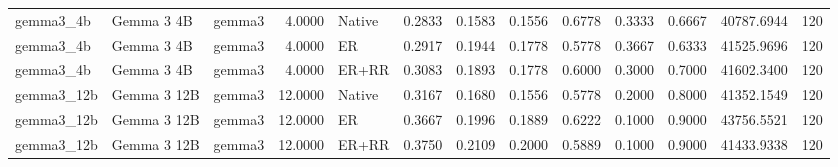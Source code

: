 \begin{tabular}{lllrlrrrrrrrr}
gemma3_4b & Gemma 3 4B & gemma3 & 4.0000 & Native & 0.2833 & 0.1583 & 0.1556 & 0.6778 & 0.3333 & 0.6667 & 40787.6944 & 120 \\
gemma3_4b & Gemma 3 4B & gemma3 & 4.0000 & ER & 0.2917 & 0.1944 & 0.1778 & 0.5778 & 0.3667 & 0.6333 & 41525.9696 & 120 \\
gemma3_4b & Gemma 3 4B & gemma3 & 4.0000 & ER+RR & 0.3083 & 0.1893 & 0.1778 & 0.6000 & 0.3000 & 0.7000 & 41602.3400 & 120 \\
gemma3_12b & Gemma 3 12B & gemma3 & 12.0000 & Native & 0.3167 & 0.1680 & 0.1556 & 0.5778 & 0.2000 & 0.8000 & 41352.1549 & 120 \\
gemma3_12b & Gemma 3 12B & gemma3 & 12.0000 & ER & 0.3667 & 0.1996 & 0.1889 & 0.6222 & 0.1000 & 0.9000 & 43756.5521 & 120 \\
gemma3_12b & Gemma 3 12B & gemma3 & 12.0000 & ER+RR & 0.3750 & 0.2109 & 0.2000 & 0.5889 & 0.1000 & 0.9000 & 41433.9338 & 120 \\
\bottomrule
\end{tabular}
